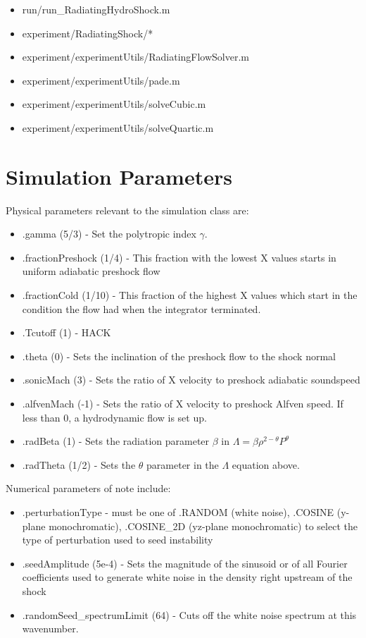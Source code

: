 \documentclass[letterpaper,12pt,twocolumn]{article}
\begin{document}
\begin{itemize}
\item run/run\_RadiatingHydroShock.m
\item experiment/RadiatingShock/*
\item experiment/experimentUtils/RadiatingFlowSolver.m
\item experiment/experimentUtils/pade.m
\item experiment/experimentUtils/solveCubic.m
\item experiment/experimentUtils/solveQuartic.m
\end{itemize}

\section{Simulation Parameters}

Physical parameters relevant to the simulation class are:
\begin{itemize}
\item .gamma (5/3) - Set the polytropic index $\gamma$.
\item .fractionPreshock (1/4) - This fraction with the lowest X values starts in uniform adiabatic preshock flow
\item .fractionCold (1/10) - This fraction of the highest X values which start in the condition the flow had when the integrator terminated.
\item .Tcutoff (1) - HACK
\item .theta  (0) - Sets the inclination of the preshock flow to the shock normal
\item .sonicMach (3) - Sets the ratio of X velocity to preshock adiabatic soundspeed
\item .alfvenMach (-1) - Sets the ratio of X velocity to preshock Alfven speed. If less than 0, a hydrodynamic flow is set up.
\item .radBeta (1) - Sets the radiation parameter $\beta$ in $\Lambda = \beta \rho^{2-\theta} P^\theta$
\item .radTheta (1/2) - Sets the $\theta$ parameter in the $\Lambda$ equation above.
\end{itemize}

Numerical parameters of note include:
\begin{itemize}
\item .perturbationType - must be one of .RANDOM (white noise), .COSINE (y-plane monochromatic), .COSINE\_2D (yz-plane monochromatic) to select the type of perturbation used to seed instability
\item .seedAmplitude (5e-4) - Sets the magnitude of the sinusoid or of all Fourier 
coefficients used to generate white noise in the density right upstream of the shock
\item .randomSeed\_spectrumLimit (64) - Cuts off the white noise spectrum at this wavenumber.
\end{itemize}
\end{document}
